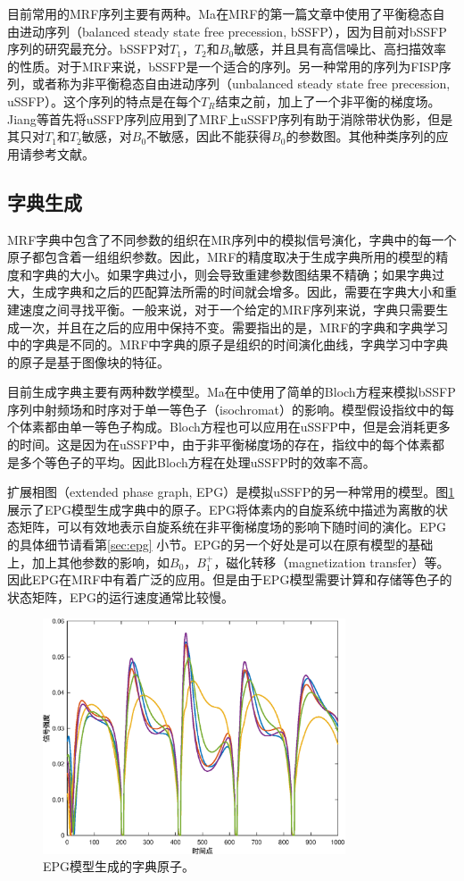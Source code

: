 目前常用的MRF序列主要有两种。Ma\cite{mrf}在MRF的第一篇文章中使用了平衡稳态自由进动序列（balanced steady state free precession, bSSFP\cite{ussfp}），因为目前对bSSFP序列的研究最充分。bSSFP对$T_1$，$T_2$和$B_0$敏感，并且具有高信噪比、高扫描效率的性质。对于MRF来说，bSSFP是一个适合的序列。另一种常用的序列为FISP序列，或者称为非平衡稳态自由进动序列（unbalanced steady state free precession, uSSFP）。这个序列的特点是在每个$T_R$结束之前，加上了一个非平衡的梯度场。Jiang\cite{jiang}等首先将uSSFP序列应用到了MRF上uSSFP序列有助于消除带状伪影，但是其只对$T_1$和$T_2$敏感，对$B_0$不敏感，因此不能获得$B_0$的参数图。其他种类序列的应用请参考文献\cite{joint,quest}。

\subsection{字典生成}
MRF字典中包含了不同参数的组织在MR序列中的模拟信号演化，字典中的每一个原子都包含着一组组织参数。因此，MRF的精度取决于生成字典所用的模型的精度和字典的大小。如果字典过小，则会导致重建参数图结果不精确；如果字典过大，生成字典和之后的匹配算法所需的时间就会增多。因此，需要在字典大小和重建速度之间寻找平衡。一般来说，对于一个给定的MRF序列来说，字典只需要生成一次，并且在之后的应用中保持不变。需要指出的是，MRF的字典和字典学习中的字典是不同的。MRF中字典的原子是组织的时间演化曲线，字典学习中字典的原子是基于图像块的特征。

目前生成字典主要有两种数学模型。Ma在\cite{mrf}中使用了简单的Bloch方程来模拟bSSFP序列中射频场和时序对于单一等色子（isochromat）的影响。模型假设指纹中的每个体素都由单一等色子构成。Bloch方程也可以应用在uSSFP中，但是会消耗更多的时间。这是因为在uSSFP中，由于非平衡梯度场的存在，指纹中的每个体素都是多个等色子的平均。因此Bloch方程在处理uSSFP时的效率不高。

扩展相图（extended phase graph, EPG\cite{weigel}）是模拟uSSFP的另一种常用的模型。图\ref{fig:atoms}展示了EPG模型生成字典中的原子。EPG将体素内的自旋系统中描述为离散的状态矩阵，可以有效地表示自旋系统在非平衡梯度场的影响下随时间的演化。EPG的具体细节请看第\ref{sec:epg} 小节。EPG的另一个好处是可以在原有模型的基础上，加上其他参数的影响，如$B_0$，$B_1^+$，磁化转移（magnetization transfer）等。因此EPG在MRF中有着广泛的应用。但是由于EPG模型需要计算和存储等色子的状态矩阵，EPG的运行速度通常比较慢。
\begin{figure}[htbp]
\centering
\includegraphics[width=0.8\textwidth]{img/intro/atoms.eps}
\caption{EPG模型生成的字典原子。}
\label{fig:atoms}
\end{figure}

